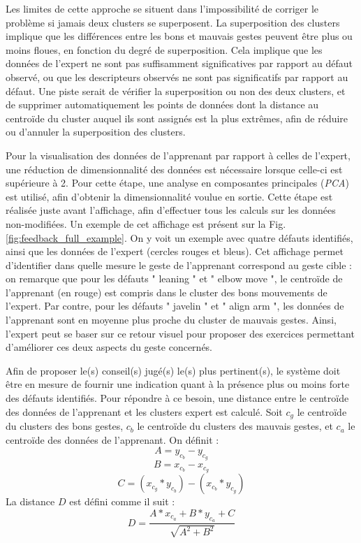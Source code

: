 Les limites de cette approche se situent dans l'impossibilité de corriger le problème si jamais deux clusters se superposent. La superposition des clusters implique que les différences entre les bons et mauvais gestes peuvent être plus ou moins floues, en fonction du degré de superposition. Cela implique que les données de l'expert ne sont pas suffisamment significatives par rapport au défaut observé, ou que les descripteurs observés ne sont pas significatifs par rapport au défaut. Une piste serait de vérifier la superposition ou non des deux clusters, et de supprimer automatiquement les points de données dont la distance au centroïde du cluster auquel ils sont assignés est la plus extrêmes, afin de réduire ou d'annuler la superposition des clusters.

Pour la visualisation des données de l'apprenant par rapport à celles de l'expert, une réduction de dimensionnalité des données est nécessaire lorsque celle-ci est supérieure à 2. Pour cette étape, une analyse en composantes principales (\textit{PCA}) est utilisé, afin d'obtenir la dimensionnalité voulue en sortie. Cette étape est réalisée juste avant l'affichage, afin d'effectuer tous les calculs sur les données non-modifiées. Un exemple de cet affichage est présent sur la Fig. \ref{fig:feedback_full_example}. On y voit un exemple avec quatre défauts identifiés, ainsi que les données de l'expert (cercles rouges et bleus). Cet affichage permet d'identifier dans quelle mesure le geste de l'apprenant correspond au geste cible : on remarque que pour les défauts " leaning " et " elbow move ", le centroïde de l'apprenant (en rouge) est compris dans le cluster des bons mouvements de l'expert. Par contre, pour les défauts " javelin " et " align arm ", les données de l'apprenant sont en moyenne plus proche du cluster de mauvais gestes. Ainsi, l'expert peut se baser sur ce retour visuel pour proposer des exercices permettant d'améliorer ces deux aspects du geste concernés.

Afin de proposer le(s) conseil(s) jugé(s) le(s) plus pertinent(s), le système doit être en mesure de fournir une indication quant à la présence plus ou moins forte des défauts identifiés. Pour répondre à ce besoin, une distance entre le centroïde des données de l'apprenant et les clusters expert est calculé. Soit $c_g$ le centroïde du clusters des bons gestes, $c_b$ le centroïde du clusters des mauvais gestes, et $c_a$ le centroïde des données de l'apprenant. On définit :
\[ A = y_{c_b} - y_{c_g} \]
\[ B = x_{c_b} - x_{c_g} \]
\[ C = (x_{c_g} * y_{c_b}) - (x_{c_b} * y_{c_g}) \]
La distance $D$ est défini comme il suit :
\[ D = \frac{A * x_{c_a}+ B * y_{c_a} + C}{\sqrt{A^2 + B^2}}\]


